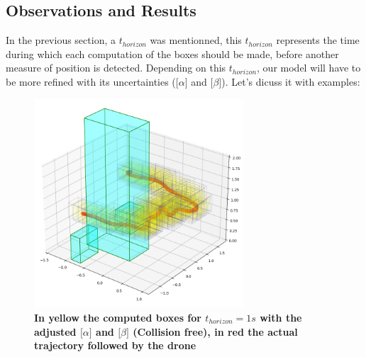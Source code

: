 \documentclass[letterpaper, 10 pt, conference]{ieeeconf}  %
\begin{document}
\subsection{Observations and Results} 
In the previous section, a $t_{horizon}$ was mentionned, this $t_{horizon}$ represents the time during which each computation of the boxes should be made, before another measure of position is detected. Depending on this $t_{horizon}$, our model will have to be more refined with its uncertainties ($\lbrack \alpha \rbrack$ and $\lbrack \beta \rbrack$). Let's dicuss it with examples:
\begin{figure}[h!]
\centering
\includegraphics[width=7.8cm]{dynibex.png}
\caption{ \textbf{In yellow the computed boxes for $t_{horizon} = 1 s$ with the adjusted $\lbrack \alpha \rbrack$ and $\lbrack \beta \rbrack$ (Collision free), in red the actual trajectory followed by the drone}}
\label{fig:image3}
\end{figure}
\end{document}
